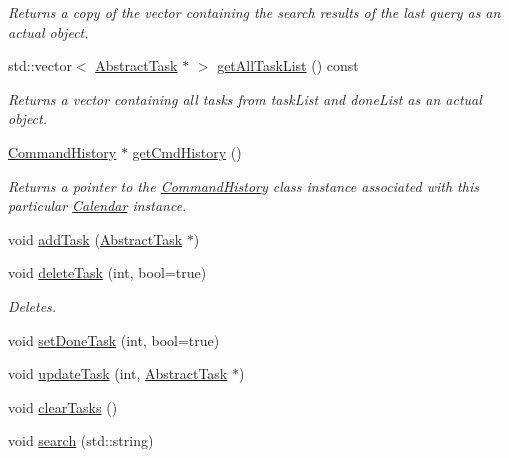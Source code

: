 \begin{DoxyCompactItemize}
\begin{DoxyCompactList}\small\item\em Returns a copy of the vector containing the search results of the last query as an actual object. \end{DoxyCompactList}\item 
std\+::vector$<$ \hyperlink{class_do_lah_1_1_abstract_task}{Abstract\+Task} $\ast$ $>$ \hyperlink{class_do_lah_1_1_calendar_a190db0f939a52b40fbec2482056820f4}{get\+All\+Task\+List} () const 
\begin{DoxyCompactList}\small\item\em Returns a vector containing all tasks from task\+List and done\+List as an actual object. \end{DoxyCompactList}\item 
\hyperlink{class_do_lah_1_1_command_history}{Command\+History} $\ast$ \hyperlink{class_do_lah_1_1_calendar_a65c6f8e5a6bc421d20eded6fbf6221ae}{get\+Cmd\+History} ()
\begin{DoxyCompactList}\small\item\em Returns a pointer to the \hyperlink{class_do_lah_1_1_command_history}{Command\+History} class instance associated with this particular \hyperlink{class_do_lah_1_1_calendar}{Calendar} instance. \end{DoxyCompactList}\item 
void \hyperlink{class_do_lah_1_1_calendar_a962c1ff0c5d697282fa5943a5e62a538}{add\+Task} (\hyperlink{class_do_lah_1_1_abstract_task}{Abstract\+Task} $\ast$)
\item 
void \hyperlink{class_do_lah_1_1_calendar_a4f5d55b04a1ea3b62f03a3cad19b12c9}{delete\+Task} (int, bool=true)
\begin{DoxyCompactList}\small\item\em Deletes. \end{DoxyCompactList}\item 
void \hyperlink{class_do_lah_1_1_calendar_af4e2ac9b3563863cb402c3070dc4a068}{set\+Done\+Task} (int, bool=true)
\item 
void \hyperlink{class_do_lah_1_1_calendar_aeeaf96fc786f7bb10f4f705990463376}{update\+Task} (int, \hyperlink{class_do_lah_1_1_abstract_task}{Abstract\+Task} $\ast$)
\item 
void \hyperlink{class_do_lah_1_1_calendar_a35b75de2b1203f707c25fe7f75b8f58b}{clear\+Tasks} ()
\item 
void \hyperlink{class_do_lah_1_1_calendar_a91fa97512b28c6c09c28d912340c1e2e}{search} (std\+::string)
\item 

\end{DoxyCompactItemize}
